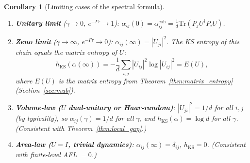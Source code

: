 \documentclass[12pt,a4paper]{article}
\newtheorem{corollary}[theorem]{Corollary}
\begin{document}
\begin{corollary}[Limiting cases of the spectral formula]
\label{cor:spectral_limits}
\begin{enumerate}
\item \textbf{Unitary limit} ($\gamma\to 0$, $e^{-\Gamma\tau}\to 1$):
  $\alpha_{ij}(0) = \alpha_{ij}^{\mathrm{coh}} = \tfrac{1}{d}\mathrm{Tr}(P_j U^\dagger P_i U)$.
\item \textbf{Zeno limit} ($\gamma\to\infty$, $e^{-\Gamma\tau}\to 0$):
  $\alpha_{ij}(\infty) = |U_{ji}|^2$.
  The KS entropy of this chain equals the \emph{matrix entropy of $U$}:
  \[
    h_{\mathrm{KS}}(\alpha(\infty))
    = -\frac{1}{d}\sum_{i,j}|U_{ij}|^2\log|U_{ij}|^2
    = E(U),
  \]
  where $E(U)$ is the matrix entropy from Theorem~\ref{thm:matrix_entropy}
  (Section~\ref{sec:mub}).
\item \textbf{Volume-law ($U$ dual-unitary or Haar-random)}:
  $|U_{ji}|^2 = 1/d$ for all $i,j$ (by typicality), so
  $\alpha_{ij}(\gamma) = 1/d$ for all $\gamma$, and
  $h_{\mathrm{KS}}(\alpha) = \log d$ for all $\gamma$.
  (Consistent with Theorem~\ref{thm:local_gap}.)
\item \textbf{Area-law ($U = I$, trivial dynamics)}:
  $\alpha_{ij}(\infty) = \delta_{ij}$, $h_{\mathrm{KS}} = 0$.
  (Consistent with finite-level AFL $= 0$.)
\end{enumerate}
\end{corollary}
\end{document}
